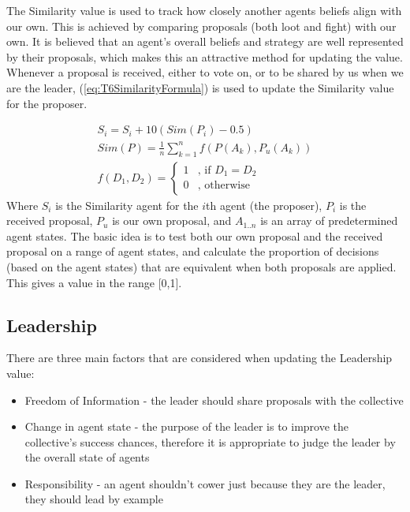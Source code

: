 The Similarity value is used to track how closely another agents beliefs align with our own. This is achieved by comparing proposals (both loot and fight) with our own. It is believed that an agent's overall beliefs and strategy are well represented by their proposals, which makes this an attractive method for updating the value.\\

Whenever a proposal is received, either to vote on, or to be shared by us when we are the leader, (\ref{eq:T6SimilarityFormula}) is used to update the Similarity value for the proposer.

\begin{equation}\label{eq:T6SimilarityFormula}
    \begin{aligned}
    S_{i}=S_{i}+10(Sim(P_{i})-0.5) \\
    Sim(P) = \frac{1}{n}\sum_{k=1}^{n}f(P(A_{k}),P_{u}(A_{k})) \\
    f(D_{1},D_{2})=\left\{
    	\begin{array}{ll}
    		1 & \mbox{, if } D_{1} = D_{2} \\
    		0 & \mbox{, otherwise} 
    	\end{array}\right.
    \end{aligned}
\end{equation}
Where $S_{i}$ is the Similarity agent for the $i$th agent (the proposer), $P_{i}$ is the received proposal, $P_{u}$ is our own proposal, and $A_{1..n}$ is an array of predetermined agent states. The basic idea is to test both our own proposal and the received proposal on a range of agent states, and calculate the proportion of decisions (based on the agent states) that are equivalent when both proposals are applied. This gives a value in the range [0,1].

\subsection{Leadership}

There are three main factors that are considered when updating the Leadership value:

\begin{itemize}
    \item Freedom of Information - the leader should share proposals with the collective
    \item Change in agent state - the purpose of the leader is to improve the collective's success chances, therefore it is appropriate to judge the leader by the overall state of agents
    \item Responsibility - an agent shouldn't cower just because they are the leader, they should lead by example
\end{itemize}

